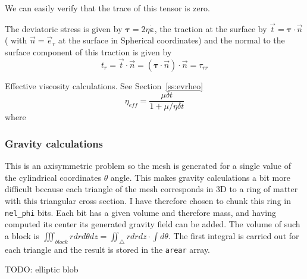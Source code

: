 We can easily verify that the trace of this tensor is zero.

The deviatoric stress is given by 
${\bm \tau}=2\eta \dot{\bm \varepsilon}$,
the traction at the surface  by 
$\vec{t}={\bm \tau}\cdot \vec{n}$ (
with $\vec{n}=\vec{e}_r$ at the surface in Spherical coordinates) and the normal to the surface component of this traction 
is given by
\[
t_r = \vec{t}\cdot \vec{n} = ({\bm \tau}\cdot \vec{n})\cdot \vec{n} = \tau_{rr}
\]




Effective viscosity calculations. See Section~\ref{ss:evrheo}
\[
\eta_{eff} = \frac{\mu \delta t}{1+\mu/\eta \delta t} 
\]
where

 
\subsubsection*{Gravity calculations}

This is an axisymmetric problem so the mesh is generated for a single value of the cylindrical 
coordinates $\theta$ angle. 
This makes gravity calculations a bit more difficult because each triangle of the mesh corresponds
in 3D to a ring of matter with this triangular cross section. 
I have therefore chosen to chunk this ring in {\tt nel\_phi} bits. Each bit has a given volume and therefore
mass, and having computed its center its generated gravity field can be added. 
The volume of such a block is $\iiint_{block} r dr d\theta dz =\iint_\triangle rdrdz \cdot \int d\theta$.  
The first integral is carried out for each triangle and the result is stored in the {\tt arear} array. 







TODO: elliptic blob
